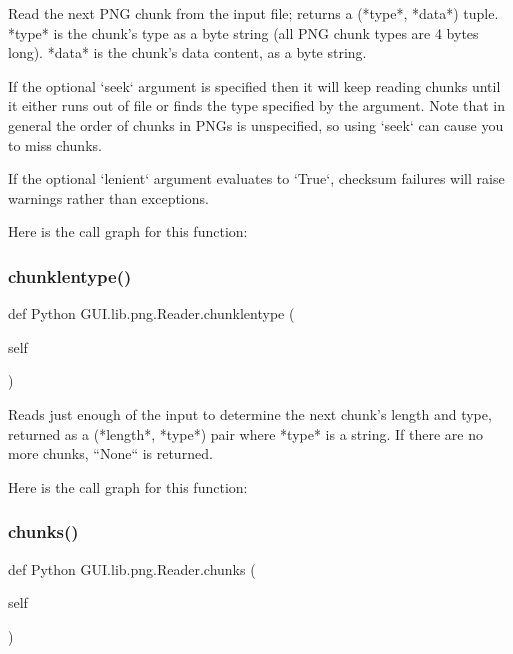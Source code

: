 \begin{DoxyVerb}Read the next PNG chunk from the input file; returns a
(*type*, *data*) tuple.  *type* is the chunk's type as a
byte string (all PNG chunk types are 4 bytes long).
*data* is the chunk's data content, as a byte string.

If the optional `seek` argument is
specified then it will keep reading chunks until it either runs
out of file or finds the type specified by the argument.  Note
that in general the order of chunks in PNGs is unspecified, so
using `seek` can cause you to miss chunks.

If the optional `lenient` argument evaluates to `True`,
checksum failures will raise warnings rather than exceptions.
\end{DoxyVerb}
 Here is the call graph for this function\+:
\mbox{\label{class_python_01_g_u_i_1_1lib_1_1png_1_1_reader_af64dd7c0a755095c8cc34cdb175b0737}} 
\subsubsection{\texorpdfstring{chunklentype()}{chunklentype()}}
{\footnotesize\ttfamily def Python G\+U\+I.\+lib.\+png.\+Reader.\+chunklentype (\begin{DoxyParamCaption}\item[{}]{self }\end{DoxyParamCaption})}

\begin{DoxyVerb}Reads just enough of the input to determine the next
chunk's length and type, returned as a (*length*, *type*) pair
where *type* is a string.  If there are no more chunks, ``None``
is returned.
\end{DoxyVerb}
 Here is the call graph for this function\+:
\mbox{\label{class_python_01_g_u_i_1_1lib_1_1png_1_1_reader_a5543f80c2ea7a9800e97bebc5a1669b3}} 
\subsubsection{\texorpdfstring{chunks()}{chunks()}}
{\footnotesize\ttfamily def Python G\+U\+I.\+lib.\+png.\+Reader.\+chunks (\begin{DoxyParamCaption}\item[{}]{self }\end{DoxyParamCaption})}

